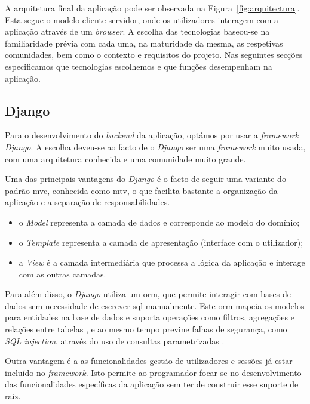 A arquitetura final da aplicação pode ser observada na Figura~\ref{fig:arquitectura}. Esta segue o modelo cliente-servidor, onde os utilizadores interagem com a aplicação através de um \textit{browser}. A escolha das tecnologias baseou-se na familiaridade prévia com cada uma, na maturidade da mesma, as respetivas comunidades, bem como o contexto e requisitos do projeto. Nas seguintes secções especificamos que tecnologias escolhemos e que funções desempenham na aplicação.

\subsection{Django}

Para o desenvolvimento do \textit{backend} da aplicação, optámos por usar a \textit{framework} \textit{Django}. A escolha deveu-se ao facto de o \textit{Django} ser uma \textit{framework} muito usada, com uma arquitetura conhecida e uma comunidade muito grande.

Uma das principais vantagens do \textit{Django}\cite{djangodocs} é o facto de seguir uma variante do padrão \gls{mvc}, conhecida como \gls{mtv},  o que facilita bastante a organização da aplicação e a separação de responsabilidades.

\begin{itemize}
    \item o \textit{Model} representa a camada de dados e corresponde ao modelo do domínio;

    \item o \textit{Template} representa a camada de apresentação (interface com o utilizador);

    \item a \textit{View} é a camada intermediária que processa a lógica da aplicação e interage com as outras camadas.
\end{itemize}

Para além disso, o \textit{Django} utiliza um \gls{orm}, que permite interagir com bases de dados sem necessidade de escrever \gls{sql} manualmente. Este \gls{orm} mapeia os modelos para entidades na base de dados e suporta operações como filtros, agregações e relações entre tabelas \cite{djangodocs}, e ao mesmo tempo previne falhas de segurança, como \textit{SQL injection}, através do uso de consultas parametrizadas \cite{kumar2016security}.

Outra vantagem é a as funcionalidades gestão de utilizadores e sessões já estar incluído no \textit{framework}. Isto permite ao programador focar-se no desenvolvimento das funcionalidades específicas da aplicação sem ter de construir esse suporte de raiz.

